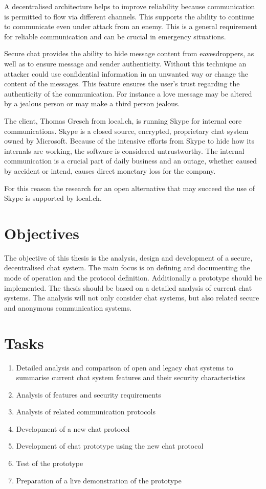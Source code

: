 A decentralised architecture helps to improve reliability because communication is
permitted to flow via different channels. This supports the ability to 
continue to communicate even under attack from an enemy. This is a general
requirement for reliable communication and can be crucial in emergency situations.

Secure chat provides the ability to hide message content from eavesdroppers,
as well as to ensure message and sender authenticity. Without this technique
an attacker could use confidential information in an unwanted way or change the
content of the messages. This feature ensures the user's trust regarding
the authenticity of the communication. For instance a love message may
be altered by a jealous person or may make a third person jealous.

The client, Thomas Gresch from local.ch, is running Skype for internal core 
communications. Skype is a closed source, encrypted, proprietary chat system 
owned by Microsoft. Because of the intensive efforts from Skype to hide how 
its internals are working, the software is considered untrustworthy.
The internal communication is a crucial part of daily business and an 
outage, whether caused by accident or intend, causes direct monetary 
loss for the company.

For this reason the research for an open alternative that may succeed 
the use of Skype is supported by local.ch.
\section{Objectives}
\label{objectives}
The objective of this thesis is the analysis, design and development of a secure, decentralised chat system. The main focus is on defining and documenting the mode of operation and the protocol definition. Additionally a prototype should be implemented. The thesis should be based on a detailed analysis of current chat systems. The analysis will not only consider chat systems, but also related secure and anonymous communication systems.
\section{Tasks}
\begin{enumerate}
\item Detailed analysis and comparison of open and legacy chat systems to summarise current chat system features and their security characteristics
\item Analysis of features and security requirements
\item Analysis of related communication protocols
\item Development of a new chat protocol
\item Development of chat prototype using the new chat protocol
\item Test of the prototype
\item Preparation of a live demonstration of the prototype
\end{enumerate}
